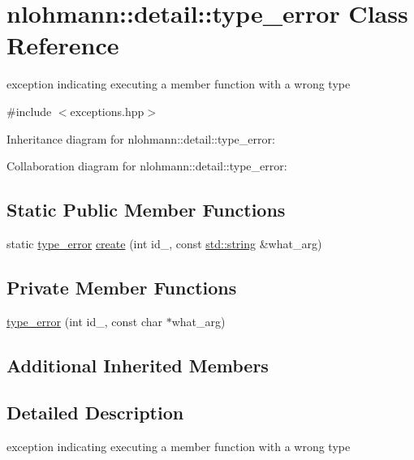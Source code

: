 \hypertarget{classnlohmann_1_1detail_1_1type__error}{}\section{nlohmann\+:\+:detail\+:\+:type\+\_\+error Class Reference}
\label{classnlohmann_1_1detail_1_1type__error}


exception indicating executing a member function with a wrong type  




{\ttfamily \#include $<$exceptions.\+hpp$>$}



Inheritance diagram for nlohmann\+:\+:detail\+:\+:type\+\_\+error\+:


Collaboration diagram for nlohmann\+:\+:detail\+:\+:type\+\_\+error\+:
\subsection*{Static Public Member Functions}
\begin{DoxyCompactItemize}
\item 
static \hyperlink{classnlohmann_1_1detail_1_1type__error}{type\+\_\+error} \hyperlink{classnlohmann_1_1detail_1_1type__error_aecc083aea4b698c33d042670ba50c10f}{create} (int id\+\_\+, const \hyperlink{namespacenlohmann_1_1detail_a1ed8fc6239da25abcaf681d30ace4985ab45cffe084dd3d20d928bee85e7b0f21}{std\+::string} \&what\+\_\+arg)
\end{DoxyCompactItemize}
\subsection*{Private Member Functions}
\begin{DoxyCompactItemize}
\item 
\hyperlink{classnlohmann_1_1detail_1_1type__error_aa01edaa0bf18b853368f0b900e485cd7}{type\+\_\+error} (int id\+\_\+, const char $\ast$what\+\_\+arg)
\end{DoxyCompactItemize}
\subsection*{Additional Inherited Members}


\subsection{Detailed Description}
exception indicating executing a member function with a wrong type 

